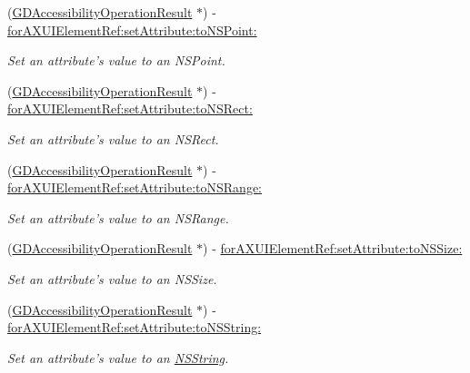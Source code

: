 \begin{DoxyCompactItemize}
(\hyperlink{interface_g_d_accessibility_operation_result}{GDAccessibilityOperationResult} $\ast$) -\/ \hyperlink{interface_g_d_accessibility_manager_aebd9e4bd904df0513641112d83df41d8}{forAXUIElementRef:setAttribute:toNSPoint:}
\begin{DoxyCompactList}\small\item\em Set an attribute's value to an NSPoint. \item\end{DoxyCompactList}\item 
(\hyperlink{interface_g_d_accessibility_operation_result}{GDAccessibilityOperationResult} $\ast$) -\/ \hyperlink{interface_g_d_accessibility_manager_acb7c3a3be1de6bdf614a08cc461f5c75}{forAXUIElementRef:setAttribute:toNSRect:}
\begin{DoxyCompactList}\small\item\em Set an attribute's value to an NSRect. \item\end{DoxyCompactList}\item 
(\hyperlink{interface_g_d_accessibility_operation_result}{GDAccessibilityOperationResult} $\ast$) -\/ \hyperlink{interface_g_d_accessibility_manager_acabbfd253bc37b73d799978bcabb37b4}{forAXUIElementRef:setAttribute:toNSRange:}
\begin{DoxyCompactList}\small\item\em Set an attribute's value to an NSRange. \item\end{DoxyCompactList}\item 
(\hyperlink{interface_g_d_accessibility_operation_result}{GDAccessibilityOperationResult} $\ast$) -\/ \hyperlink{interface_g_d_accessibility_manager_a9ebf98303317b2e55a27ca31bef44942}{forAXUIElementRef:setAttribute:toNSSize:}
\begin{DoxyCompactList}\small\item\em Set an attribute's value to an NSSize. \item\end{DoxyCompactList}\item 
(\hyperlink{interface_g_d_accessibility_operation_result}{GDAccessibilityOperationResult} $\ast$) -\/ \hyperlink{interface_g_d_accessibility_manager_a47b117c336fb6627353a74ab78cdd6a1}{forAXUIElementRef:setAttribute:toNSString:}
\begin{DoxyCompactList}\small\item\em Set an attribute's value to an \hyperlink{class_n_s_string}{NSString}. \item\end{DoxyCompactList}\item 

\end{DoxyCompactItemize}
